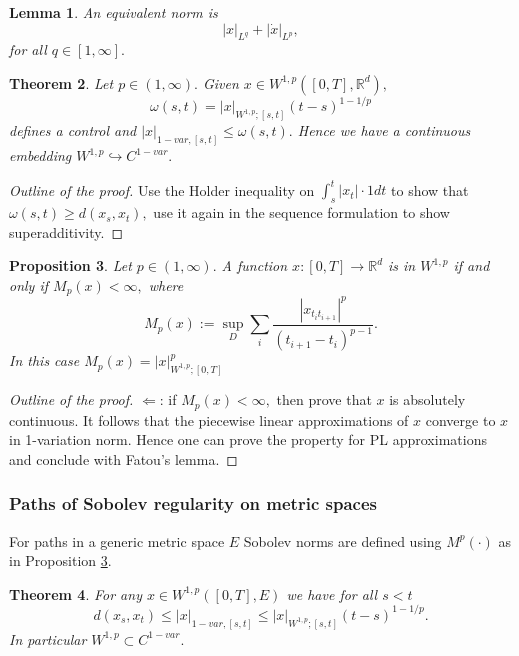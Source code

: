 \documentclass{article}
\newcommand{\R}{\mathbb{R}}
\newtheorem{theorem}{Theorem}
\newtheorem{prop}[theorem]{Proposition}
\newtheorem{lemma}[theorem]{Lemma}
\begin{document}
\begin{lemma}
    An equivalent norm is 
    \begin{equation}
        |x|_{L^q} + |\dot{x}|_{L^p},
    \end{equation}
    for all $q \in [1,\infty].$
\end{lemma}

\begin{theorem}
    Let $p \in (1,\infty).$ Given $x \in W^{1,p}([0,T],\R^d),$
    \begin{equation}
        \omega(s,t) = |x|_{W^{1,p};[s,t]}(t - s)^{1 - 1/p}
    \end{equation}
    defines a control and $|x|_{1-var,[s,t]} \leq \omega(s,t).$ Hence we have a continuous embedding $W^{1,p} \hookrightarrow C^{1-var}.$
\end{theorem}
\begin{proof}[Outline of the proof]
    Use the Holder inequality on $\int_s^t |x_t| \cdot 1 dt$ to show that $\omega(s,t) \geq d(x_s, x_t),$ use it again in the sequence formulation to show superadditivity.
\end{proof}

\begin{prop}\label{theo:sobolevnorm}
    Let $p \in (1,\infty).$ A function $x: [0,T] \rightarrow \R^d$ is in $W^{1,p}$ if and only if $M_p(x) < \infty,$ where
    \begin{equation}
        M_p(x) := \sup_D \sum_i \frac{|x_{t_i t_{i+1}}|^p}{(t_{i+1} - t_i)^{p-1}}.
    \end{equation}
    In this case $M_p(x) = |x|^p_{W^{1,p};[0,T]}$
\end{prop}
\begin{proof}[Outline of the proof]
    $\Leftarrow$: if $M_p(x) < \infty,$ then prove that $x$ is absolutely continuous. 
    It follows that the piecewise linear approximations of $x$ converge to $x$ in 1-variation norm.
    Hence one can prove the property for PL approximations and conclude with Fatou's lemma.
\end{proof}

\subsubsection{Paths of Sobolev regularity on metric spaces}

For paths in a generic metric space $E$ Sobolev norms are defined using $M^p(\cdot)$ as in Proposition \ref{theo:sobolevnorm}. 

\begin{theorem}
    For any $x \in W^{1,p}([0,T], E)$ we have for all $s < t$
    \begin{equation}
        d(x_s, x_t) \leq |x|_{1-var, [s,t]} \leq |x|_{W^{1,p};[s,t]} (t - s)^{1 - 1/p}.
    \end{equation}
    In particular $W^{1,p} \subset C^{1-var}.$
\end{theorem}
\end{document}
